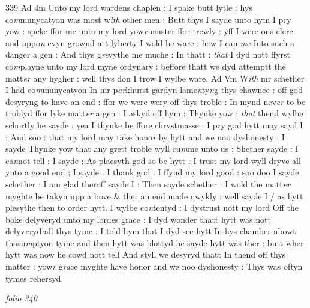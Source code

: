 \documentclass[12pt, a4paper]{book}
\begin{document}
{\color{Mahogany}339} Ad 4m  Unto my lord wardens chaplen : I spake butt lytle : hys co\textit{m}munycatyon was most w\textit{ith }other men : Butt thys I sayde unto hym I p\textit{r}y yow : speke ffor me unto my lord yow\textit{r} master ffor trewly : yff I were ons clere and uppo\textit{n} evyn grownd att lyberty I wold be ware : how I cam\textit{m}e Into such a danger a gen : And thys g\textit{re}vythe me muche : In thatt : \textit{that} I dyd nott  ffyrst co\textit{m}playne unto my lord myne ordynary : beffore thatt we dyd attemptt the matt\textit{er} any hygher : well thys don I trow I wylbe ware.  Ad Vm  W\textit{ith} mr schether I had co\textit{m}munycatyon In mr p\textit{ar}khurst gardyn lame\textit{n}ty\textit{n}g thys chawnce : off god desyryng to have an end : ffor we were wery off thys troble : In mynd nev\textit{er} to be troblyd ffor lyke matt\textit{er} a gen : I askyd off hym : Thynke yow : \textit{that} thend wylbe schortly  he sayde : yea I thynke be ffore chrystmasse : I p\textit{r}y god hytt may sayd I : And soo : that my lord may take hono\textit{r} by hytt and we noo dyshonesty : I sayde Thynke yow that any grett troble wyll cu\textit{m}me unto us : Shether sayde : I ca\textit{n}not tell : I sayde : As plaesyth god so be hytt : I trust my lord wyll dryve  all ynto a good end ; I sayde : I thank god : I ffynd my lord good : soo doo I sayde schether : I am glad theroff sayde I : Then  sayde schether : I wold the matt\textit{er} myghte be takyn upp a bove \& ther an end made qwykly : well sayde I / as hytt plesythe then to order hytt. I wylbe co\textit{n}tentyd : I dystrust nott my lord Off the boke delyveryd unto my lordes grace : I dyd wonder thatt hytt  was nott delyv\textit{er}yd all thys tyme : I told hym that I dyd see hytt In hys chamber abowt thasu\textit{m}ptyon tyme and then hytt was blottyd he sayde hytt was ther : butt wher hytt was now he cowd nott tell And styll we desyryd thatt In thend off thys matter : yow\textit{r} g\textit{ra}ce myghte have honor and we noo dyshonesty : Thys was oftyn tymes rehersyd.

\dotfill
					

\textit{folio 340}
\end{document}
